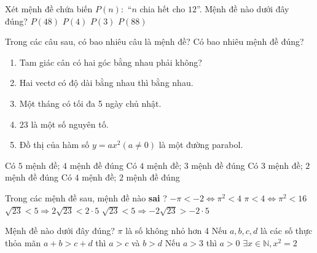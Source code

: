 \begin{ex}%
Xét mệnh đề chứa biến $P(n):$ “$n$ chia hết cho $12$”. Mệnh đề nào dưới đây đúng?
\choice 
{\True $P(48)$} 
{ $P(4) $} 
{ $P(3)$} 
{ $P(88)$}
\end{ex}

\begin{ex}%
Trong các câu sau, có bao nhiêu câu là mệnh đề? Có bao nhiêu mệnh đề đúng?
\begin{enumerate}
\item Tam giác cân có hai góc bằng nhau phải không?
\item Hai vectơ có độ dài bằng nhau thì bằng nhau.
\item Một tháng có tối đa 5 ngày chủ nhật.
\item $23$ là một số nguyên tố.
\item Đồ thị của hàm số $y=ax^2(a \neq 0)$ là một đường parabol.
\end{enumerate}
\choice
{Có $5$ mệnh đề; $4$ mệnh đề đúng}
{\True Có $4$ mệnh đề; $3$ mệnh đề đúng}
{Có $3$ mệnh đề; $2$ mệnh đề đúng}
{Có $4$ mệnh đề; $2$ mệnh đề đúng}
\end{ex}
\begin{ex}%
Trong các mệnh đề sau, mệnh đề nào \textbf{sai} ?
\choice 
{ \True $-\pi <-2\Leftrightarrow {{\pi }^2}<4$}
{ $\pi <4\Leftrightarrow {{\pi }^2}<16$} 
{ $\sqrt{23}<5\Rightarrow 2\sqrt{23}<2\cdot5$}
{ $\sqrt{23}<5\Rightarrow -2\sqrt{23}>-2\cdot5$}
\end{ex} 
\begin{ex}%
Mệnh đề nào dưới đây đúng?
\choice 
{ $\pi$ là số không nhỏ hơn 4} 
{ Nếu $a, b, c, d$ là các số thực thỏa mãn $a+b>c+d$ thì $a>c$ và $b>d$} 
{ \True Nếu $a>3$ thì $a>0$} 
{ $\exists x\in \mathbb{N},x^2=2$ }
\end{ex}

